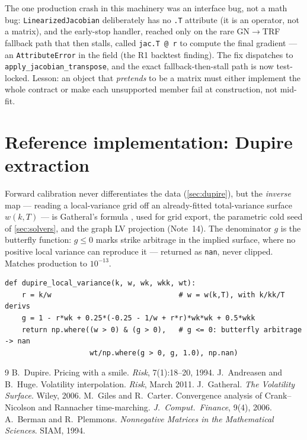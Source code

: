 \documentclass[11pt]{article}
\begin{document}
\begin{caution}[title={Caution (engineering): the field crash that pretended to be a matrix}]
The one production crash in this machinery was an interface bug, not a math
bug: \texttt{LinearizedJacobian} deliberately has no \texttt{.T} attribute
(it is an operator, not a matrix), and the early-stop handler, reached only
on the rare GN$\to$TRF fallback path that then stalls, called
\texttt{jac.T @ r} to compute the final gradient --- an
\texttt{AttributeError} in the field (the R1 backtest finding). The fix
dispatches to \texttt{apply\_jacobian\_transpose}, and the exact
fallback-then-stall path is now test-locked. Lesson: an object that
\emph{pretends} to be a matrix must either implement the whole contract or
make each unsupported member fail at construction, not mid-fit.
\end{caution}

\section{Reference implementation: Dupire extraction}
\label{app:ref}

Forward calibration never differentiates the data (\cref{sec:dupire}), but the
\emph{inverse} map --- reading a local-variance grid off an already-fitted
total-variance surface $w(k,T)$ --- is Gatheral's formula
\cite{Gatheral2006}, used for grid export, the parametric cold seed of
\cref{sec:solvers}, and the graph LV projection (Note~14). The denominator $g$
is the butterfly function: $g\le0$ marks strike arbitrage in the implied
surface, where no positive local variance can reproduce it --- returned as
\texttt{nan}, never clipped. Matches production to $10^{-13}$.

\begin{lstlisting}[caption={Dupire/Gatheral local variance from an implied
total-variance surface (distilled from \texttt{models/localvol/dupire.py}).}]
def dupire_local_variance(k, w, wk, wkk, wt):
    r = k/w                              # w = w(k,T), with k/kk/T derivs
    g = 1 - r*wk + 0.25*(-0.25 - 1/w + r*r)*wk*wk + 0.5*wkk
    return np.where((w > 0) & (g > 0),   # g <= 0: butterfly arbitrage -> nan
                    wt/np.where(g > 0, g, 1.0), np.nan)
\end{lstlisting}

\begin{thebibliography}{9}
 B.~Dupire. Pricing with a smile. \emph{Risk}, 7(1):18--20,
1994.
 J.~Andreasen and B.~Huge. Volatility interpolation.
\emph{Risk}, March 2011.
 J.~Gatheral. \emph{The Volatility Surface}. Wiley, 2006.
 M.~Giles and R.~Carter. Convergence analysis of
Crank--Nicolson and Rannacher time-marching. \emph{J.\ Comput.\ Finance},
9(4), 2006.
 A.~Berman and R.~Plemmons. \emph{Nonnegative
Matrices in the Mathematical Sciences}. SIAM, 1994.
\end{thebibliography}
\end{document}
